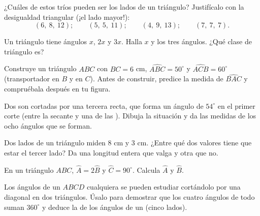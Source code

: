 \begin{exercise}[$\star$]\label{exo:g7:triangles:5}
¿Cuáles de estos tríos pueden ser los lados de un triángulo? Justifícalo con la
desigualdad triangular (¡el lado mayor!):
\[
(6,\ 8,\ 12); \qquad
(5,\ 5,\ 11); \qquad
(4,\ 9,\ 13); \qquad
(7,\ 7,\ 7).
\]
\end{exercise}

\begin{exercise}[$\star$]\label{exo:g7:triangles:6}
Un triángulo tiene ángulos $x$, $2x$ y $3x$. Halla $x$ y los tres
ángulos. ¿Qué clase de triángulo es?
\end{exercise}

\begin{exercise}[$\star$]\label{exo:g7:triangles:7}
Construye un triángulo $ABC$ con $BC = 6$ cm,
$\widehat{ABC} = 50^\circ$ y $\widehat{ACB} = 60^\circ$ (transportador
en $B$ y en $C$). Antes de construir, predice la medida de
$\widehat{BAC}$ y compruébala después en tu figura.
\end{exercise}

\begin{exercise}[$\star\star$]\label{exo:g7:triangles:8}
Dos  son cortadas por una tercera recta, que forma un ángulo de
$54^\circ$ en el primer corte (entre la secante y una de las
). Dibuja la situación y da las medidas de los ocho
ángulos que se forman.
\end{exercise}

\begin{exercise}[$\star\star$]\label{exo:g7:triangles:9}
Dos lados de un triángulo miden $8$ cm y $3$ cm. ¿Entre qué dos
valores tiene que estar el tercer lado? Da una longitud entera que valga
y otra que no.
\end{exercise}

\begin{exercise}[$\star\star$]\label{exo:g7:triangles:10}
En un triángulo $ABC$, $\widehat A = 2\widehat B$ y
$\widehat C = 90^\circ$. Calcula $\widehat A$ y $\widehat B$.
\end{exercise}

\begin{exercise}[$\star\star\star$]\label{exo:g7:triangles:11}
Los ángulos de un  $ABCD$ cualquiera se pueden estudiar
cortándolo por una diagonal en dos triángulos. Úsalo para demostrar que
los cuatro ángulos de todo  suman $360^\circ$ y
deduce la  de los ángulos de un  (cinco lados).
\end{exercise}

